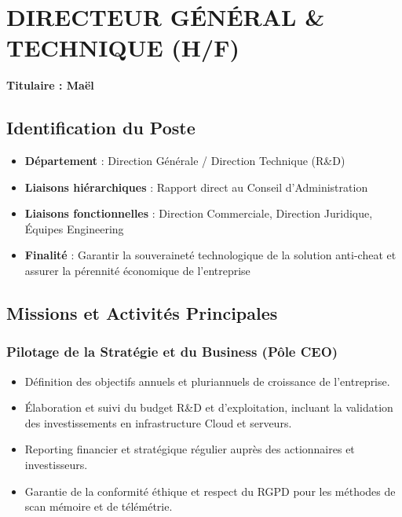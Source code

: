 \documentclass[12pt,a4paper]{article}
\begin{document}
\section{DIRECTEUR GÉNÉRAL \& TECHNIQUE (H/F)}
\textbf{Titulaire : Maël}

\subsection{Identification du Poste}
\begin{itemize}[label=\textbullet]
    \item \textbf{Département} : Direction Générale / Direction Technique (R\&D)
    \item \textbf{Liaisons hiérarchiques} : Rapport direct au Conseil d'Administration
    \item \textbf{Liaisons fonctionnelles} : Direction Commerciale, Direction Juridique, Équipes Engineering
    \item \textbf{Finalité} : Garantir la souveraineté technologique de la solution anti-cheat et assurer la pérennité économique de l'entreprise
\end{itemize}

\subsection{Missions et Activités Principales}

\subsubsection{Pilotage de la Stratégie et du Business (Pôle CEO)}
\begin{itemize}[label=\textbullet]
    \item Définition des objectifs annuels et pluriannuels de croissance de l'entreprise.
    \item Élaboration et suivi du budget R\&D et d'exploitation, incluant la validation des investissements en infrastructure Cloud et serveurs.
    \item Reporting financier et stratégique régulier auprès des actionnaires et investisseurs.
    \item Garantie de la conformité éthique et respect du RGPD pour les méthodes de scan mémoire et de télémétrie.
\end{itemize}
\end{document}
